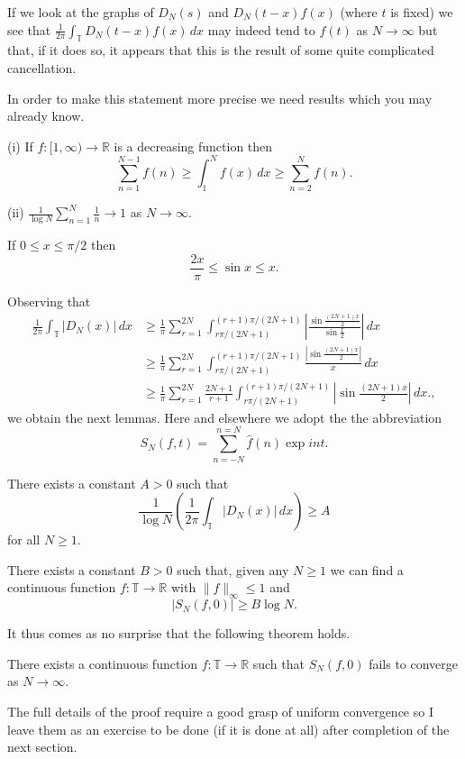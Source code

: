 If we look at the graphs of $D_{N}(s)$ and $D_{N}(t-x)f(x)$
(where $t$ is fixed) we see that
$\frac{1}{2\pi}\int_{\mathbb T}D_{N}(t-x)f(x)\,dx$
may indeed tend to $f(t)$ as $N\rightarrow\infty$ but that,
if it does so, it appears that this is the result of some quite
complicated cancellation.

In order to make this statement more precise we need
results which you may already know.
\begin{lemma} (i) If
$f:[1,\infty)\rightarrow{\mathbb R}$ is a decreasing
function then
\[\sum_{n=1}^{N-1}f(n)\geq\int_{1}^{N}f(x)\,dx
\geq \sum_{n=2}^{N}f(n).\]

(ii) ${\displaystyle \frac{1}{\log N}\sum_{n=1}^{N}\frac{1}{n}
\rightarrow 1}$ as $N\rightarrow\infty$.
\end{lemma}
\begin{lemma} If $0\leq x\leq \pi/2$ then
\[\frac{2x}{\pi}\leq \sin x\leq x.\]
\end{lemma}

Observing that
\begin{align*}
\frac{1}{2\pi}\int_{\mathbb T}|D_{N}(x)|\,dx&
\geq \frac{1}{\pi}\sum_{r=1}^{2N}\int_{r\pi/(2N+1)}^{(r+1)\pi/(2N+1)}
\left|\frac{\sin\frac{(2N+1)x}{2}}{\sin\frac{x}{2}}\right|\,dx\\
&\geq \frac{1}{\pi}\sum_{r=1}^{2N}\int_{r\pi/(2N+1)}^{(r+1)\pi/(2N+1)}
\frac{|\sin\frac{(2N+1)x}{2}|}{x}\,dx\\
&\geq \frac{1}{\pi}\sum_{r=1}^{2N}\frac{2N+1}{r+1}
\int_{r\pi/(2N+1)}^{(r+1)\pi/(2N+1)}
\left|\sin\frac{(2N+1)x}{2}\right|\,dx.,
\end{align*}
we obtain the next lemmas.
Here and elsewhere we adopt the the abbreviation
\[S_{N}(f,t)=\sum_{n=-N}^{n=N}\hat{f}(n)\exp int.\]

\begin{lemma}\label{L Dirichlet large}
There exists a constant $A>0$ such that
\[\frac{1}{\log N}\left(\frac{1}{2\pi}\int_{\mathbb T}|D_{N}(x)|\,dx\right)
\geq A\]
for all $N\geq 1$.
\end{lemma}
\begin{lemma}\label{L, start divergence}
There exists a constant $B>0$ such that,
given any $N\geq 1$ we can find a continuous function
$f:{\mathbb T}\rightarrow{\mathbb R}$ with
$\|f\|_{\infty}\leq 1$ and
\[|S_{N}(f,0)|\geq B\log N.\]
\end{lemma}

It thus comes as no surprise that the following
theorem holds.
\begin{theorem} There exists a continuous function
$f:{\mathbb T}\rightarrow{\mathbb R}$ such that
$S_{N}(f,0)$ fails to converge as $N\rightarrow\infty$.
\end{theorem}
The full details of the proof require a good grasp of
uniform convergence so I leave them as an exercise to be
done (if it is done at all) after completion of the next section.
